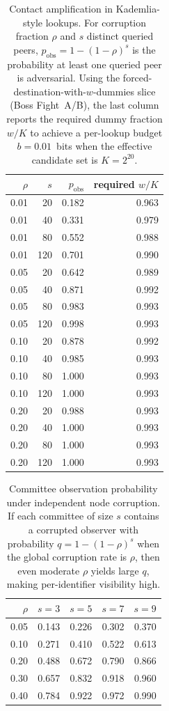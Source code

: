 \documentclass[11pt]{article}
\begin{document}
\begin{table}[t]
\centering
\caption{Contact amplification in Kademlia-style lookups. For corruption fraction $\rho$ and $s$ distinct queried peers, $p_{\mathrm{obs}}=1-(1-\rho)^s$ is the probability at least one queried peer is adversarial. Using the forced-destination-with-$w$-dummies slice (Boss Fight~A/B)\cite{series:bossfightA,series:bossfightB}, the last column reports the required dummy fraction $w/K$ to achieve a per-lookup budget $b=0.01$~bits when the effective candidate set is $K=2^{20}$.}
\label{tab:kad_contact_sweep}
\begin{tabular}{rrrr}
\toprule
$\rho$ & $s$ & $p_{\mathrm{obs}}$ & required $w/K$ \\
\midrule
0.01 & 20 & 0.182 & 0.963 \\
0.01 & 40 & 0.331 & 0.979 \\
0.01 & 80 & 0.552 & 0.988 \\
0.01 & 120 & 0.701 & 0.990 \\
\midrule
0.05 & 20 & 0.642 & 0.989 \\
0.05 & 40 & 0.871 & 0.992 \\
0.05 & 80 & 0.983 & 0.993 \\
0.05 & 120 & 0.998 & 0.993 \\
\midrule
0.10 & 20 & 0.878 & 0.992 \\
0.10 & 40 & 0.985 & 0.993 \\
0.10 & 80 & 1.000 & 0.993 \\
0.10 & 120 & 1.000 & 0.993 \\
\midrule
0.20 & 20 & 0.988 & 0.993 \\
0.20 & 40 & 1.000 & 0.993 \\
0.20 & 80 & 1.000 & 0.993 \\
0.20 & 120 & 1.000 & 0.993 \\
\bottomrule
\end{tabular}
\end{table}


\begin{table}[t]
\centering
\caption{Committee observation probability under independent node corruption. If each committee of size $s$ contains a corrupted observer with probability $q=1-(1-\rho)^s$ when the global corruption rate is $\rho$, then even moderate $\rho$ yields large $q$, making per-identifier visibility high.}
\label{tab:committee-visibility}
\begin{tabular}{r r r r r}
\toprule
$\rho$ & $s=3$ & $s=5$ & $s=7$ & $s=9$\\
\midrule
0.05 & 0.143 & 0.226 & 0.302 & 0.370 \\
0.10 & 0.271 & 0.410 & 0.522 & 0.613 \\
0.20 & 0.488 & 0.672 & 0.790 & 0.866 \\
0.30 & 0.657 & 0.832 & 0.918 & 0.960 \\
0.40 & 0.784 & 0.922 & 0.972 & 0.990 \\
\bottomrule
\end{tabular}
\end{table}
\end{document}
